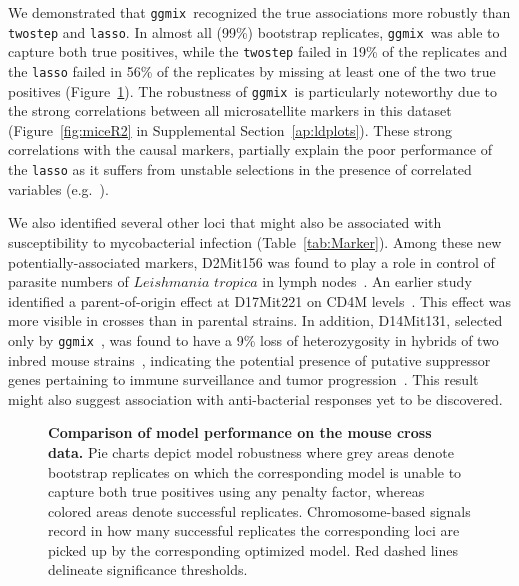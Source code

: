 \documentclass[10pt,letterpaper]{article}
\newcommand{\ggmix}{\texttt{ggmix}}
\begin{document}
We demonstrated that \ggmix ~recognized the true associations more robustly than \texttt{twostep} and \texttt{lasso}. 
In almost all (99\%) bootstrap replicates, \ggmix ~was able to capture both true positives, while the \texttt{twostep} failed in 
19\% of the replicates and the \texttt{lasso} failed in 56\% of the replicates by missing at least one of the two true positives 
(Figure~\ref{fig:Mice-comparison-fixTPR}). The robustness of \ggmix ~is particularly noteworthy due to the strong correlations between 
all microsatellite markers in this dataset (Figure~\ref{fig:miceR2} in Supplemental Section~\ref{ap:ldplots}). These strong correlations 
with the causal markers, partially explain the poor performance of the \texttt{lasso} as it suffers from unstable selections in the presence 
of correlated variables (e.g.~\cite{wang2018precision}).
	
	
	We also identified several other loci that might also be associated with susceptibility to mycobacterial infection (Table~\ref{tab:Marker}). Among these new potentially-associated markers, D2Mit156 was found to play a role in control of parasite numbers of $Leishmania$ $tropica$ in lymph nodes~\cite{sohrabi2013mapping}. An earlier study identified a parent-of-origin effect at D17Mit221 on CD4M levels~\cite{jackson1999multiple}. This effect was more visible in crosses than in parental strains. In addition, D14Mit131, selected only by \ggmix ~, was found to have a 9\% loss of heterozygosity in hybrids of two inbred mouse strains~\cite{c2000allelotype}, indicating the potential presence of putative suppressor genes pertaining to immune surveillance and tumor progression~\cite{lasko1991loss}. This result might also suggest association with anti-bacterial responses yet to be discovered. 
	


\begin{figure}[!h]
	\caption{{\bf Comparison of model performance on the mouse cross data.}
		Pie charts depict model robustness where grey areas denote bootstrap replicates on which the corresponding model is unable to capture both true positives using any penalty factor, whereas colored areas denote successful replicates. Chromosome-based signals record in how many successful replicates the corresponding loci are picked up by the corresponding optimized model. Red dashed lines delineate significance thresholds.}\label{fig:Mice-comparison-fixTPR}
\end{figure}
\end{document}
